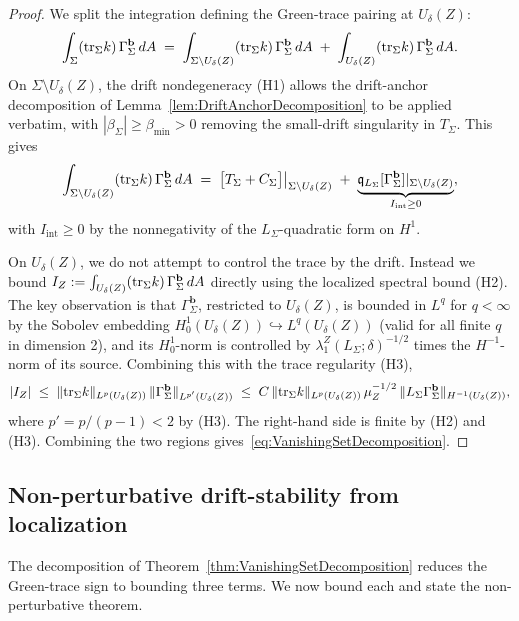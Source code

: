 \begin{proof}
We split the integration defining the Green-trace pairing at $U_\delta(Z)$:
\[
    \int_\Sigma(\mathrm{tr}_\Sigma k)\,\Gamma_\Sigma^{\mathbf b}\,dA
    \;=\;
    \int_{\Sigma\setminus U_\delta(Z)}(\mathrm{tr}_\Sigma k)\,\Gamma_\Sigma^{\mathbf b}\,dA
    \;+\;
    \int_{U_\delta(Z)}(\mathrm{tr}_\Sigma k)\,\Gamma_\Sigma^{\mathbf b}\,dA .
\]
On $\Sigma\setminus U_\delta(Z)$, the drift nondegeneracy (H1) allows the drift-anchor decomposition of Lemma~\ref{lem:DriftAnchorDecomposition} to be applied verbatim, with $|\beta_\Sigma|\ge\beta_{\min}>0$ removing the small-drift singularity in $T_\Sigma$. This gives
\[
    \int_{\Sigma\setminus U_\delta(Z)}(\mathrm{tr}_\Sigma k)\,\Gamma_\Sigma^{\mathbf b}\,dA
    \;=\;
    \bigl[T_\Sigma+C_\Sigma\bigr]\big|_{\Sigma\setminus U_\delta(Z)}
    \;+\;\underbrace{\mathfrak q_{L_\Sigma}[\Gamma_\Sigma^{\mathbf b}]|_{\Sigma\setminus U_\delta(Z)}}_{I_{\mathrm{int}}\ge0},
\]
with $I_{\mathrm{int}}\ge0$ by the nonnegativity of the $L_\Sigma$-quadratic form on $H^1$.

On $U_\delta(Z)$, we do not attempt to control the trace by the drift. Instead we bound $I_Z:=\int_{U_\delta(Z)}(\mathrm{tr}_\Sigma k)\,\Gamma_\Sigma^{\mathbf b}\,dA$ directly using the localized spectral bound (H2). The key observation is that $\Gamma_\Sigma^{\mathbf b}$, restricted to $U_\delta(Z)$, is bounded in $L^q$ for $q<\infty$ by the Sobolev embedding $H^1_0(U_\delta(Z))\hookrightarrow L^q(U_\delta(Z))$ (valid for all finite $q$ in dimension 2), and its $H^1_0$-norm is controlled by $\lambda_1^Z(L_\Sigma;\delta)^{-1/2}$ times the $H^{-1}$-norm of its source. Combining this with the trace regularity (H3),
\begin{equation}\label{eq:LocalizedIBound}
    |I_Z|
    \;\le\;
    \|\mathrm{tr}_\Sigma k\|_{L^p(U_\delta(Z))}\,\|\Gamma_\Sigma^{\mathbf b}\|_{L^{p'}(U_\delta(Z))}
    \;\le\;
    C\,\|\mathrm{tr}_\Sigma k\|_{L^p(U_\delta(Z))}\,\mu_Z^{-1/2}\,\|L_\Sigma\Gamma_\Sigma^{\mathbf b}\|_{H^{-1}(U_\delta(Z))},
\end{equation}
where $p'=p/(p-1)<2$ by (H3). The right-hand side is finite by (H2) and (H3). Combining the two regions gives~\eqref{eq:VanishingSetDecomposition}.
\end{proof}

\subsection{Non-perturbative drift-stability from localization}

The decomposition of Theorem~\ref{thm:VanishingSetDecomposition} reduces the Green-trace sign to bounding three terms. We now bound each and state the non-perturbative theorem.

